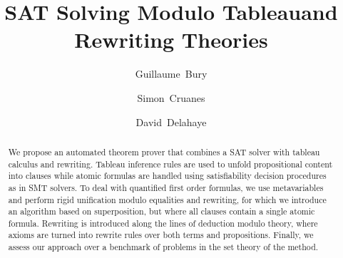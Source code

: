 \documentclass[orivec]{llncs}
\begin{document}
\title{SAT Solving Modulo Tableau\break{}and Rewriting Theories}

\author{Guillaume~Bury \and Simon~Cruanes \and
David~Delahaye}


\maketitle

\begin{abstract}
We propose an automated theorem prover that combines a SAT solver with tableau
calculus and rewriting. Tableau inference rules are used to unfold propositional
content into clauses while atomic formulas are handled using satisfiability
decision procedures as in SMT solvers. To deal with quantified first order
formulas, we use metavariables and perform rigid unification modulo equalities
and rewriting, for which we introduce an algorithm based on superposition, but
where all clauses contain a single atomic formula. Rewriting is introduced along
the lines of deduction modulo theory, where axioms are turned into rewrite rules
over both terms and propositions. Finally, we assess our approach over a
benchmark of problems in the set theory of the \bmth{} method.

\end{abstract}









\end{document}
